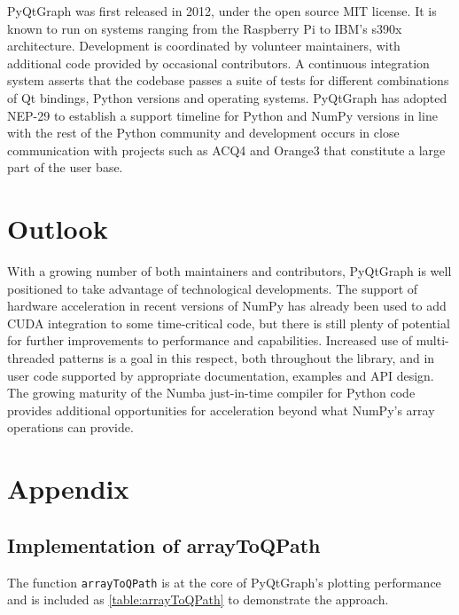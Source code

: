 PyQtGraph was first released in 2012, under the open source MIT license. It is known to run on systems ranging from the Raspberry Pi to IBM's s390x architecture. Development is coordinated by volunteer maintainers, with additional code provided by occasional contributors. A continuous integration system asserts that the codebase passes a suite of tests for different combinations of Qt bindings, Python versions and operating systems. PyQtGraph has adopted NEP-29\cite{NEP-29} to establish a support timeline for Python and NumPy versions in line with the rest of the Python community and development occurs in close communication with projects such as ACQ4\cite{10.3389/fninf.2014.00003} and Orange3\cite{JMLR:demsar13a} that constitute a large part of the user base.

\section{Outlook}
With a growing number of both maintainers and contributors, PyQtGraph is well positioned to take advantage of technological developments. The support of hardware acceleration in recent versions of NumPy has already been used to add CUDA integration to some time-critical code, but there is still plenty of potential for further improvements to performance and capabilities. Increased use of multi-threaded patterns is a goal in this respect, both throughout the library, and in user code supported by appropriate documentation, examples and API design. The growing maturity of the Numba just-in-time compiler \cite{lam2015numba} for Python code provides additional opportunities for acceleration beyond what NumPy's array operations can provide.



\section{Appendix}

\subsection{Implementation of arrayToQPath}
\label{app_arrayToQPath}
The function \texttt{arrayToQPath} is at the core of PyQtGraph's plotting performance and is included as \autoref{table:arrayToQPath} to demonstrate the approach.

